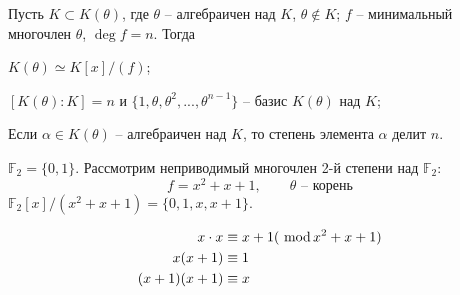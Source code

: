 \begin{Thm}
	Пусть $K \subset K(\theta)$, где $\theta$ -- алгебраичен над $K$, $\theta \notin K$; $f$ -- минимальный многочлен $\theta$, $\deg f = n$.
	Тогда 
	\begin{MyList}
		\item $K(\theta) \simeq K[x] / (f)$;
		\item $[K(\theta) : K] = n$ и $\{1, \theta, \theta^2, ..., \theta^{n - 1}\}$ -- базис $K(\theta)$ над $K$;
		\item Если $\alpha \in K(\theta)$ -- алгебраичен над $K$, то степень элемента $\alpha$ делит $n$.  
	\end{MyList} 
\end{Thm}

\begin{Example}
	$\mathbb{F}_2 = \{0, 1\}$. Рассмотрим неприводимый многочлен 2-й степени над $\mathbb{F}_2$:
	\[f = x^2 + x + 1, \qquad \theta \text{ -- корень}\]
	$\mathbb{F}_2[x] / (x^2 + x + 1) = \{0, 1, x, x + 1\}$.

	\begin{align*}
		x \cdot x &\equiv x + 1 (\ \mathrm{mod}\, x^2 + x + 1) \\
		x (x + 1) &\equiv 1 \\
		(x + 1)(x + 1) &\equiv x
	\end{align*}

\end{Example}

